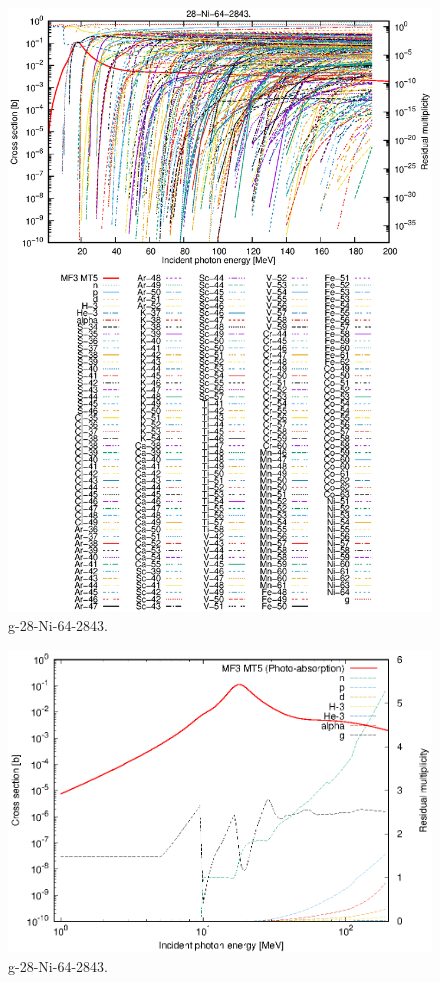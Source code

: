 \begin{figure}
 \includegraphics[width=\linewidth]{eps/g_28-Ni-64_2843.eps}
  \caption{g-28-Ni-64-2843.}
\end{figure}
\newpage \clearpage

\begin{figure}
 \includegraphics[width=\linewidth]{eps-log/g_28-Ni-64_2843.eps}
 \caption{g-28-Ni-64-2843.}
\end{figure}
\newpage \clearpage

